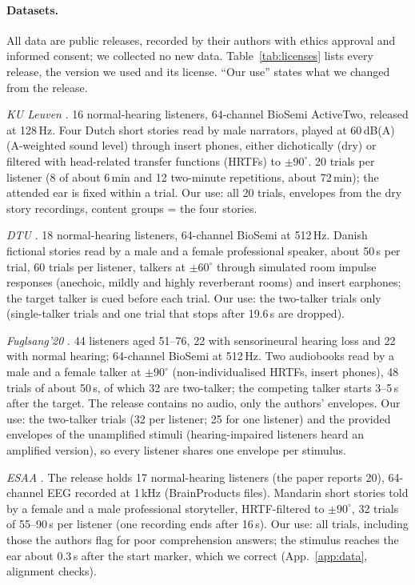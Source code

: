 \paragraph{Datasets.} All data are public releases, recorded by their authors with ethics
approval and informed consent; we collected no new data. Table~\ref{tab:licenses} lists every
release, the version we used and its license. ``Our use'' states what we changed from the
release.

\emph{KU Leuven} \citep{das2016kul,biesmans2017auditory}. 16 normal-hearing listeners,
64-channel BioSemi ActiveTwo, released at 128\,Hz. Four Dutch short stories read by male
narrators, played at 60\,dB(A) (A-weighted sound level) through insert phones, either dichotically
(dry) or filtered with head-related transfer functions (HRTFs) to $\pm90^\circ$. 20 trials per listener (8 of about 6\,min and 12 two-minute
repetitions, about 72\,min); the attended ear is fixed within a trial. Our use: all 20
trials, envelopes from the dry story recordings, content groups = the four stories.

\emph{DTU} \citep{fuglsang2017dtu}. 18 normal-hearing listeners, 64-channel BioSemi at
512\,Hz. Danish fictional stories read by a male and a female professional speaker, about
50\,s per trial, 60 trials per listener, talkers at $\pm60^\circ$ through simulated room
impulse responses (anechoic, mildly and highly reverberant rooms) and insert earphones; the
target talker is cued before each trial. Our use: the two-talker trials only (single-talker
trials and one trial that stops after 19.6\,s are dropped).

\emph{Fuglsang'20} \citep{fuglsang2020effects}. 44 listeners aged 51--76, 22 with
sensorineural hearing loss and 22 with normal hearing; 64-channel BioSemi at 512\,Hz. Two
audiobooks read by a male and a female talker at $\pm90^\circ$ (non-individualised HRTFs,
insert phones), 48 trials of about 50\,s, of which 32 are two-talker; the competing talker
starts 3--5\,s after the target. The release contains no audio, only the authors'
envelopes. Our use: the two-talker trials (32 per listener; 25 for one listener) and the provided envelopes of the
unamplified stimuli (hearing-impaired listeners heard an amplified version), so every listener
shares one envelope per stimulus.

\emph{ESAA} \citep{li2022esaa}. The release holds 17 normal-hearing listeners (the paper
reports 20), 64-channel EEG recorded at 1\,kHz (BrainProducts files). Mandarin short
stories told by a female and a male professional storyteller, HRTF-filtered to $\pm90^\circ$,
32 trials of 55--90\,s per listener (one recording ends after 16\,s). Our use: all trials, including those the authors flag
for poor comprehension answers; the stimulus reaches the ear about 0.3\,s after the start
marker, which we correct (App.~\ref{app:data}, alignment checks).

